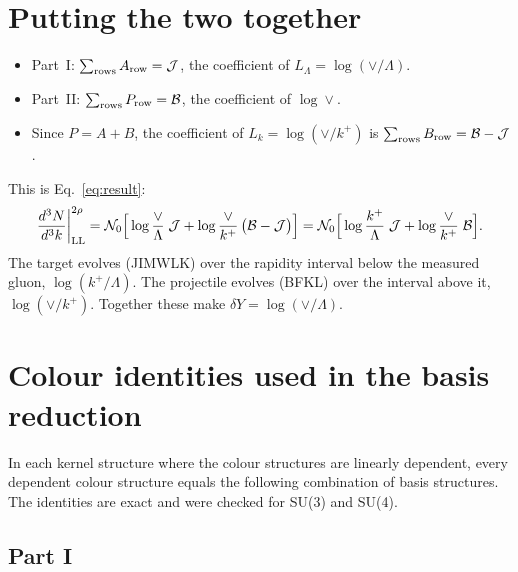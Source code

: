 \documentclass[10pt]{article}
\numberwithin{equation}{section}
\newcommand{\NO}{\mathcal N_0}
\newcommand{\LL}{L_\Lambda}
\newcommand{\Lk}{L_k}
\newcommand{\J}{\mathcal J}
\newcommand{\B}{\mathcal B}
\begin{document}
\section{Putting the two together}\label{sec:together}
\begin{itemize}
\item Part~I: $\sum_{\rm rows}A_{\rm row}=\J$, the coefficient of $\LL=\log(\vee/\Lambda)$.
\item Part~II: $\sum_{\rm rows}P_{\rm row}=\B$, the coefficient of $\log\vee$.
\item Since $P=A+B$, the coefficient of $\Lk=\log(\vee/k^+)$ is $\sum_{\rm rows}B_{\rm row}=\B-\J$.
\end{itemize}
This is Eq.~\eqref{eq:result}:
\begin{equation*}
\frac{d^3N}{d^3k}\bigg|_{\rm LL}^{2\rho}=\NO\Big[\log\frac{\vee}{\Lambda}\;\J+\log\frac{\vee}{k^+}\,\big(\B-\J\big)\Big]=\NO\Big[\log\frac{k^+}{\Lambda}\;\J+\log\frac{\vee}{k^+}\;\B\Big].
\end{equation*}
The target evolves (JIMWLK) over the rapidity interval below the measured gluon, $\log(k^+/\Lambda)$. The projectile evolves (BFKL) over the interval above it, $\log(\vee/k^+)$. Together these make $\delta Y=\log(\vee/\Lambda)$.

\appendix
\section{Colour identities used in the basis reduction}\label{app:rel}
In each kernel structure where the colour structures are linearly dependent, every dependent colour structure equals the following combination of basis structures. The identities are exact and were checked for SU(3) and SU(4).
\subsection{Part I}
\end{document}
